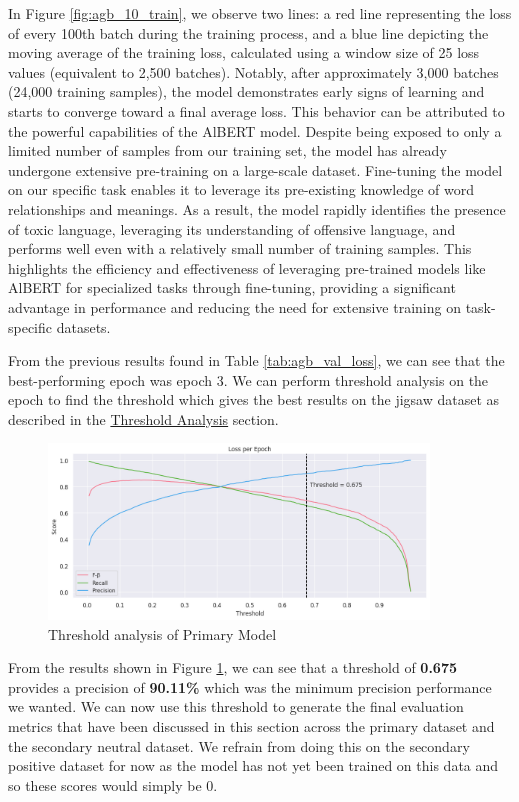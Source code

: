 In Figure \ref{fig:agb_10_train}, we observe two lines: a red line representing the loss of every 100th batch during the training process, and a blue line depicting the moving average of the training loss, calculated using a window size of 25 loss values (equivalent to 2,500 batches). Notably, after approximately 3,000 batches (24,000 training samples), the model demonstrates early signs of learning and starts to converge toward a final average loss. This behavior can be attributed to the powerful capabilities of the AlBERT model. Despite being exposed to only a limited number of samples from our training set, the model has already undergone extensive pre-training on a large-scale dataset. Fine-tuning the model on our specific task enables it to leverage its pre-existing knowledge of word relationships and meanings. As a result, the model rapidly identifies the presence of toxic language, leveraging its understanding of offensive language, and performs well even with a relatively small number of training samples. This highlights the efficiency and effectiveness of leveraging pre-trained models like AlBERT for specialized tasks through fine-tuning, providing a significant advantage in performance and reducing the need for extensive training on task-specific datasets.

From the previous results found in Table \ref{tab:agb_val_loss}, we can see that the best-performing epoch was epoch 3. We can perform threshold analysis on the epoch to find the threshold which gives the best results on the jigsaw dataset as described in the \hyperref[threshold]{Threshold Analysis} section.

\begin{figure}[H]
    \centering
    \includegraphics[width=0.9\textwidth]{graphs/training/primary_threshold.png}
    \caption{Threshold analysis of Primary Model}
    \label{fig:primary_threshold}
\end{figure}

From the results shown in Figure \ref{fig:primary_threshold}, we can see that a threshold of \textbf{0.675} provides a precision of \textbf{90.11\%} which was the minimum precision performance we wanted. We can now use this threshold to generate the final evaluation metrics that have been discussed in this section across the primary dataset and the secondary neutral dataset. We refrain from doing this on the secondary positive dataset for now as the model has not yet been trained on this data and so these scores would simply be 0.

